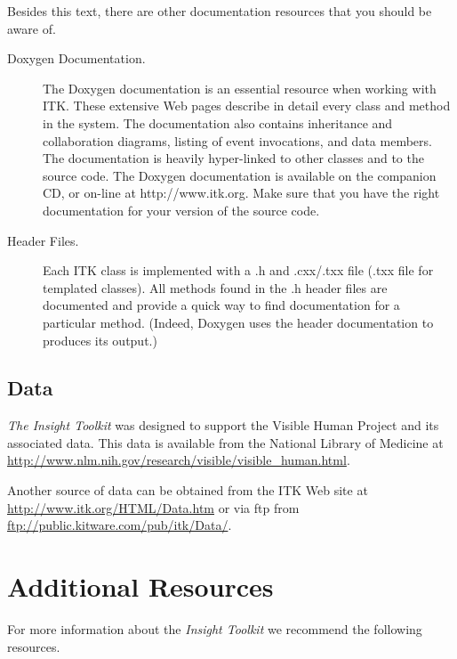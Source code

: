 Besides this text, there are other documentation resources that you should be
aware of.
\begin{description}
        \item[Doxygen Documentation.] The Doxygen documentation is an
        essential resource when working with ITK. These extensive Web pages
        describe in detail every class and method in the system. The
        documentation also contains inheritance and collaboration diagrams,
        listing of event invocations, and data members. The documentation is
        heavily hyper-linked to other classes and to the source code. The
        Doxygen documentation is available on the companion CD, or on-line at
        http://www.itk.org. Make sure that you have the right documentation
        for your version of the source code.

	\item[Header Files.] Each ITK class is implemented with a .h and
        .cxx/.txx file (.txx file for templated classes). All methods
        found in the .h header files are documented and provide a quick way
        to find documentation for a particular method. (Indeed, Doxygen uses
        the header documentation to produces its output.)
\end{description}

\subsection{Data}
\label{sec:Data}

\emph{The Insight Toolkit} was designed to support the Visible Human Project 
and its associated data. This data is available from the National Library of
Medicine at \url{http://www.nlm.nih.gov/research/visible/visible\_human.html}.

Another source of data can be obtained from the ITK Web site at 
\url{http://www.itk.org/HTML/Data.htm} or via ftp from
\url{ftp://public.kitware.com/pub/itk/Data/}.

\section{Additional Resources}
\label{sec:AdditionalResources}

For more information about the \emph{Insight Toolkit} we recommend the
following resources.


